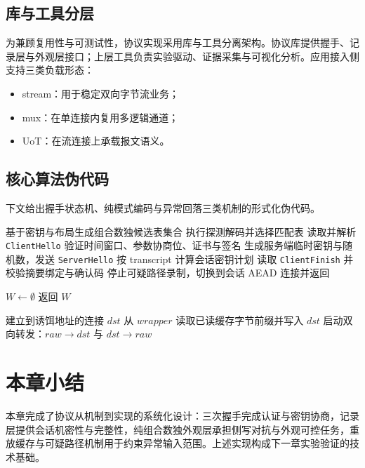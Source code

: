 \subsection{库与工具分层}
为兼顾复用性与可测试性，协议实现采用库与工具分离架构。协议库提供握手、记录层与外观层接口；上层工具负责实验驱动、证据采集与可视化分析。应用接入侧支持三类负载形态：
\begin{itemize}
  \item stream：用于稳定双向字节流业务；
  \item mux：在单连接内复用多逻辑通道；
  \item UoT：在流连接上承载报文语义。
\end{itemize}

\subsection{核心算法伪代码}
下文给出握手状态机、纯模式编码与异常回落三类机制的形式化伪代码。

\begin{algorithm}[H]
\small
\caption{服务端握手校验：探测、认证、重放检查后切换会话}
\label{alg:c3-server-handshake}
基于密钥与布局生成组合数独候选表集合\;
执行探测解码并选择匹配表\;
读取并解析 \texttt{ClientHello}\;
验证时间窗口、参数协商位、证书与签名\;
生成服务端临时密钥与随机数，发送 \texttt{ServerHello}\;
按 transcript 计算会话密钥计划\;
读取 \texttt{ClientFinish} 并校验摘要绑定与确认码\;
停止可疑路径录制，切换到会话 AEAD 连接并返回\;
\end{algorithm}

\begin{algorithm}[H]
\small
\caption{纯模式写路径：按阈值插入填充并输出 4 个提示字节}
\label{alg:c3-full-write}
$W \leftarrow \emptyset$\;
返回 $W$\;
\end{algorithm}

\begin{algorithm}[H]
\small
\caption{可疑流量回落策略：silent 丢弃或转发至诱饵连接}
\label{alg:c3-fallback}
建立到诱饵地址的连接 $dst$\;
从 $wrapper$ 读取已读缓存字节前缀并写入 $dst$\;
启动双向转发：$raw \rightarrow dst$ 与 $dst \rightarrow raw$\;
\end{algorithm}
\FloatBarrier

\section{本章小结}
本章完成了协议从机制到实现的系统化设计：三次握手完成认证与密钥协商，记录层提供会话机密性与完整性，纯组合数独外观层承担侧写对抗与外观可控任务，重放缓存与可疑路径机制用于约束异常输入范围。上述实现构成下一章实验验证的技术基础。
